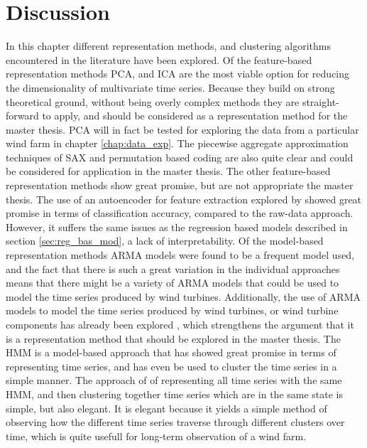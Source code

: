 \section{Discussion}
In this chapter different representation methods, and clustering algorithms encountered in the literature have been explored. 
Of the feature-based representation methods PCA, and ICA are the most viable option for reducing the dimensionality of multivariate time series.
Because they build on strong theoretical ground, without being overly complex methods they are straight-forward to apply, and should be considered as a representation method for the master thesis. 
PCA will in fact be tested for exploring the data from a particular wind farm in chapter \ref{chap:data_exp}.
The piecewise aggregate approximation techniques of SAX and permutation based coding are also quite clear and could be considered for application in the master thesis.
The other feature-based representation methods show great promise, but are not appropriate the master thesis.
The use of an autoencoder for feature extraction explored by \textcite{auto_encoder_many_tsc_algorithms} showed great promise in terms of classification accuracy, compared to the raw-data approach.
However, it suffers the same issues as the regression based models described in section \ref{sec:reg_bas_mod}, a lack of interpretability. 
Of the model-based representation methods ARMA models were found to be a frequent model used, 
and the fact that there is such a great variation in the individual approaches means that there might be a variety of ARMA models that could be used to model the time series produced by wind turbines.
Additionally, the use of ARMA models to model the time series produced by wind turbines, or wind turbine components has already been explored \cite{ml_cm_wt_blade_ARMA_2018, fault_detection_and_isolation_using_classifier_fusion, lin_and_non_lin_feat_for_ice_detection_on_blades, dirt_n_mud_detection_using_guided_waves, vibration_ARMA_decision_tree_cm_wt}, which strengthens the argument that it is a representation method that should be explored in the master thesis. %
The HMM is a model-based approach that has showed great promise in terms of representing time series, and has even be used to cluster the time series \cite{hmm_pm10_quantifying_impacts} in a simple manner.
The approach of \textcite{hmm_pm10_quantifying_impacts} of representing all time series with the same HMM, and then clustering together time series which are in the same state is simple, but also elegant.
It is elegant because it yields a simple method of observing how the different time series traverse through different clusters over time, which is quite usefull for long-term observation of a wind farm. \bigskip

